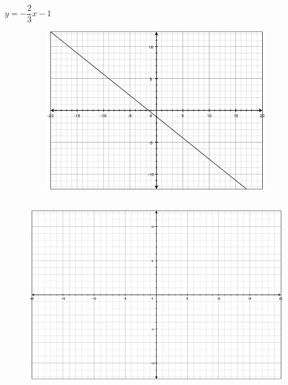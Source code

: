 \documentclass[fleqn,addpoints]{exam}
\begin{document}
\begin{questions}



\question[5] \( y = - \dfrac{2}{3} x - 1\)

\label{graph:first}
\begin{figure}[H]
\ifprintanswers
  \includegraphics[width=12cm,height=7cm]{problem1}
\else
  \includegraphics[width=15cm,height=9cm]{axes}
\fi
\end{figure}

\pagebreak


\end{questions}
\end{document}
